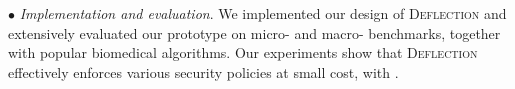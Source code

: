 \vspace{3pt}\noindent$\bullet$\textit{ Implementation and evaluation}. We implemented our design of \textsc{Deflection} and extensively evaluated our prototype on micro- and macro- benchmarks, together with popular biomedical algorithms.  Our experiments show that \textsc{Deflection} effectively enforces various security policies at small cost, with . 



